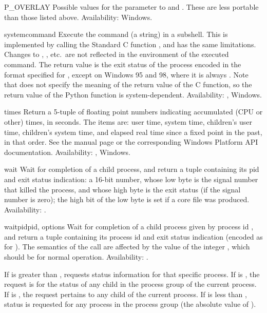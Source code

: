 \begin{datadesc}{P_OVERLAY}
Possible values for the  parameter to 
and .  These are less portable than those listed
above.
Availability: Windows.
\end{datadesc}

\begin{funcdesc}{system}{command}
Execute the command (a string) in a subshell.  This is implemented by
calling the Standard C function , and has the
same limitations.  Changes to , ,
etc.\ are not reflected in the environment of the executed command.
The return value is the exit status of the process encoded in the
format specified for , except on Windows 95 and 98,
where it is always .  Note that \POSIX{} does not specify the
meaning of the return value of the C  function,
so the return value of the Python function is system-dependent.
Availability: \UNIX{}, Windows.
\end{funcdesc}

\begin{funcdesc}{times}{}
Return a 5-tuple of floating point numbers indicating accumulated (CPU
or other)
times, in seconds.  The items are: user time, system time, children's
user time, children's system time, and elapsed real time since a fixed
point in the past, in that order.  See the \UNIX{} manual page
 or the corresponding Windows Platform API
documentation.
Availability: \UNIX{}, Windows.
\end{funcdesc}

\begin{funcdesc}{wait}{}
Wait for completion of a child process, and return a tuple containing
its pid and exit status indication: a 16-bit number, whose low byte is
the signal number that killed the process, and whose high byte is the
exit status (if the signal number is zero); the high bit of the low
byte is set if a core file was produced.
Availability: \UNIX{}.
\end{funcdesc}

\begin{funcdesc}{waitpid}{pid, options}
Wait for completion of a child process given by process id ,
and return a tuple containing its process id and exit status
indication (encoded as for ).  The semantics of the
call are affected by the value of the integer , which
should be  for normal operation.
Availability: \UNIX{}.

If  is greater than ,  requests
status information for that specific process.  If  is
, the request is for the status of any child in the process
group of the current process.  If  is , the request
pertains to any child of the current process.  If  is less
than , status is requested for any process in the process
group  (the absolute value of ).
\end{funcdesc}

